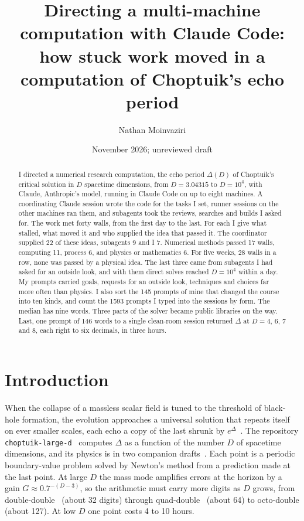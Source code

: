\documentclass[aps,prd,onecolumn,superscriptaddress,nofootinbib,10pt]{revtex4-2}
\newcommand{\file}[1]{\texttt{#1}}
\begin{document}
\title{Directing a multi-machine computation with Claude Code:\\how stuck work moved in a computation of Choptuik's echo
period}

\author{Nathan Moinvaziri}
\date{November 2026; unreviewed draft}

\begin{abstract}
I directed a numerical research computation, the echo period $\Delta(D)$ of Choptuik's critical solution in $D$ spacetime
dimensions, from $D = 3.04315$ to $D = 10^4$, with Claude, Anthropic's model, running in Claude Code on up to eight
machines. A coordinating Claude session wrote the code for the tasks I set, runner sessions on the other machines ran
them, and subagents took the reviews, searches and builds I asked for. The work met forty walls, from the first day to
the last. For each I give what stalled, what moved it and who supplied the idea that passed it. The coordinator supplied
22 of these ideas, subagents 9 and I 7. Numerical methods passed 17 walls, computing 11, process 6, and physics or
mathematics 6.
For five weeks, 28 walls in a row, none was passed by a physical idea. The last three came from subagents I had asked
for an outside look, and with them direct solves reached $D = 10^4$ within a day. My prompts carried goals, requests for
an outside look, techniques and choices far more often than physics. I also sort the 145 prompts of mine that changed
the course into ten kinds, and count the 1593 prompts I typed into the sessions by form. The median has nine words.
Three parts of the solver became public libraries on the way. Last, one prompt of 146 words to a single clean-room
session returned $\Delta$ at $D = 4$, 6, 7 and 8, each right to six decimals, in three hours.
\end{abstract}

\maketitle

\section{Introduction}
\label{sec:intro}

When the collapse of a massless scalar field is tuned to the threshold of black-hole formation, the evolution approaches
a universal solution that repeats itself on ever smaller scales, each echo a copy of the last shrunk by
$e^\Delta$~\cite{Choptuik1993}. The repository \file{choptuik-large-d}~\cite{repo} computes $\Delta$ as a function of the
number $D$ of spacetime dimensions, and its physics is in two companion drafts~\cite{physics,math}. Each point is a
periodic boundary-value problem solved by Newton's method from a prediction made at the last point. At large $D$ the
mass mode amplifies errors at the horizon by a gain $G \approx 0.7^{-(D-3)}$, so the arithmetic must carry more digits as
$D$ grows, from double-double~\cite{Dekker1971} (about 32 digits) through quad-double~\cite{HidaLiBailey2001} (about 64)
to octo-double (about 127). At low $D$ one point costs 4 to 10 hours.
\end{document}
